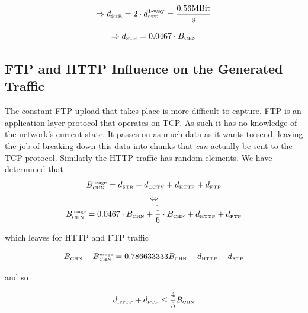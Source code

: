 \documentclass[a4paper]{scrreprt}
\begin{document}
			\[\Rightarrow d_\text{\tiny STR}=2\cdot d_\text{\tiny STR}^\text{1-way}=\frac{0.56\text{MBit}}{\text{s}}\]
			
			\[\Rightarrow d_\text{\tiny STR}=0.0467\cdot B_\text{\tiny CHN}\]
			
			\subsection{FTP and HTTP Influence on the Generated Traffic}\label{sec:ftpinfluence}
			The constant FTP upload that takes place is more difficult to capture. FTP is an application layer protocol that operates on TCP. As such it has no knowledge of the network's current state. It passes on as much data as it wants to send, leaving the job of breaking down this data into chunks that \emph{can} actually be sent to the TCP protocol. 										
			Similarly the HTTP traffic has random elements. We have determined that
			\[B_\text{\tiny CHN}^\text{\tiny usage} = d_\text{\tiny STR}+d_\text{\tiny CCTV}+d_\text{\tiny HTTP}+d_\text{\tiny FTP}\]
			\[\Leftrightarrow\]
			\[B_\text{\tiny CHN}^\text{\tiny usage} = 0.0467\cdot B_\text{\tiny CHN} + \frac{1}{6}\cdot B_\text{\tiny CHN} + d_\text{\tiny HTTP} + d_\text{\tiny FTP}\]
			
			which leaves for HTTP and FTP traffic
			
			\[B_\text{\tiny CHN}-B_\text{\tiny CHN}^\text{\tiny usage}=0.786633333B_\text{\tiny CHN} - d_\text{\tiny HTTP} - d_\text{\tiny FTP}\]
			
			and so
			
			\[d_\text{\tiny HTTP} + d_\text{\tiny FTP}\leq \frac{4}{5}B_\text{\tiny CHN}\]					
			
%			
\end{document}
